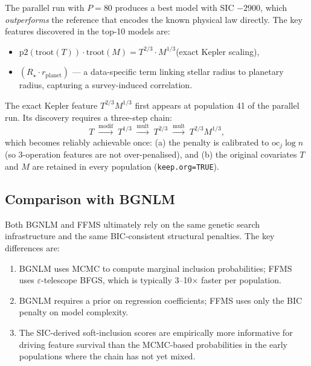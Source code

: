 \documentclass[12pt,a4paper]{article}
\newcommand{\oc}{\mathrm{oc}}
\begin{document}
The parallel run with $P=80$ produces a best model with SIC $-2900$, which
\emph{outperforms} the reference that encodes the known physical law directly.
The key features discovered in the top-10 models are:
\begin{itemize}
  \item $\mathrm{p2}(\mathrm{troot}(T))\cdot\mathrm{troot}(M)
        = T^{2/3}\cdot M^{1/3}$\quad(exact Kepler scaling),
  \item $(R_\star \cdot r_\mathrm{planet})$ — a data-specific term linking
        stellar radius to planetary radius, capturing a survey-induced correlation.
\end{itemize}

The exact Kepler feature $T^{2/3} M^{1/3}$ first appears at population 41 of the
parallel run.  Its discovery requires a three-step chain:
\begin{equation}
  T \;\xrightarrow{\text{modif}}\; T^{1/3}
  \;\xrightarrow{\text{mult}}\; T^{2/3}
  \;\xrightarrow{\text{mult}}\; T^{2/3} M^{1/3},
  \label{eq:chain}
\end{equation}
which becomes reliably achievable once: (a) the penalty is calibrated to
$\oc_j \log n$ (so 3-operation features are not over-penalised), and (b)
the original covariates $T$ and $M$ are retained in every population
(\texttt{keep.org=TRUE}).

\subsection{Comparison with BGNLM}

Both BGNLM and FFMS ultimately rely on the same genetic search infrastructure
and the same BIC-consistent structural penalties.  The key differences are:
\begin{enumerate}[label=(\roman*)]
  \item BGNLM uses MCMC to compute marginal inclusion probabilities; FFMS uses
        $\varepsilon$-telescope BFGS, which is typically 3--10$\times$ faster per
        population.
  \item BGNLM requires a prior on regression coefficients; FFMS uses only the
        BIC penalty on model complexity.
  \item The SIC-derived soft-inclusion scores are empirically more informative
        for driving feature survival than the MCMC-based probabilities in the
        early populations where the chain has not yet mixed.
\end{enumerate}
\end{document}
